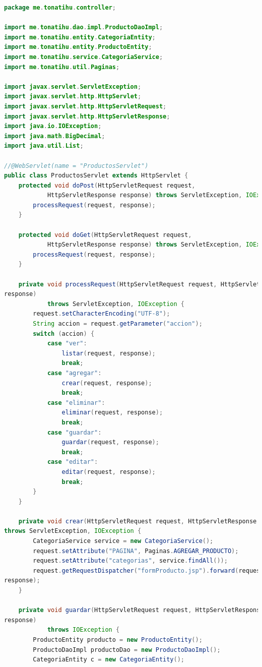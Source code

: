 \documentclass[a4paper,12pt]{article}
\begin{document}
\begin{lstlisting}[language=Java, style=customJava, 
caption={ProductosServlet.java}, 
captionpos=b,basicstyle=\fontfamily{cmss}\small]
package me.tonatihu.controller;

import me.tonatihu.dao.impl.ProductoDaoImpl;
import me.tonatihu.entity.CategoriaEntity;
import me.tonatihu.entity.ProductoEntity;
import me.tonatihu.service.CategoriaService;
import me.tonatihu.util.Paginas;

import javax.servlet.ServletException;
import javax.servlet.http.HttpServlet;
import javax.servlet.http.HttpServletRequest;
import javax.servlet.http.HttpServletResponse;
import java.io.IOException;
import java.math.BigDecimal;
import java.util.List;

//@WebServlet(name = "ProductosServlet")
public class ProductosServlet extends HttpServlet {
    protected void doPost(HttpServletRequest request,
            HttpServletResponse response) throws ServletException, IOException {
        processRequest(request, response);
    }

    protected void doGet(HttpServletRequest request,
            HttpServletResponse response) throws ServletException, IOException {
        processRequest(request, response);
    }

    private void processRequest(HttpServletRequest request, HttpServletResponse 
response)
            throws ServletException, IOException {
        request.setCharacterEncoding("UTF-8");
        String accion = request.getParameter("accion");
        switch (accion) {
            case "ver":
                listar(request, response);
                break;
            case "agregar":
                crear(request, response);
                break;
            case "eliminar":
                eliminar(request, response);
                break;
            case "guardar":
                guardar(request, response);
                break;
            case "editar":
                editar(request, response);
                break;
        }
    }

    private void crear(HttpServletRequest request, HttpServletResponse response) 
throws ServletException, IOException {
        CategoriaService service = new CategoriaService();
        request.setAttribute("PAGINA", Paginas.AGREGAR_PRODUCTO);
        request.setAttribute("categorias", service.findAll());
        request.getRequestDispatcher("formProducto.jsp").forward(request, 
response);
    }

    private void guardar(HttpServletRequest request, HttpServletResponse 
response)
            throws IOException {
        ProductoEntity producto = new ProductoEntity();
        ProductoDaoImpl productoDao = new ProductoDaoImpl();
        CategoriaEntity c = new CategoriaEntity();


\end{lstlisting}
\end{document}
